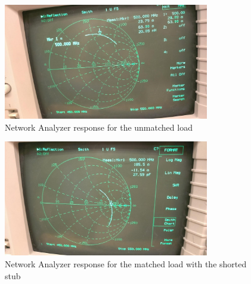 \documentclass{article}
\begin{document}
\begin{figure}[H]
    \centering
    \includegraphics[width=0.8\textwidth]{./Images/254noadj.jpg}
    \caption{Network Analyzer response for the unmatched load}
\end{figure}
\begin{figure}[H]
    \centering
    \includegraphics[width=0.8\textwidth]{./Images/254adj.jpg}
    \caption{Network Analyzer response for the matched load with the shorted stub}
\end{figure}
\end{document}
